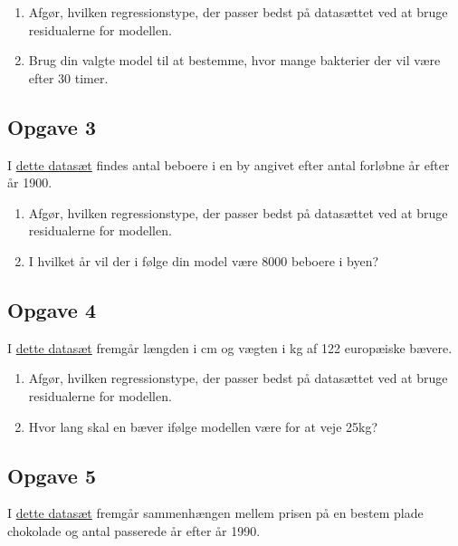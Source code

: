 \begin{enumerate}[label=\roman*)]
	\item Afgør, hvilken regressionstype, der passer bedst på datasættet ved at bruge 
	residualerne for modellen.
	\item Brug din valgte model til at bestemme, hvor mange bakterier der vil være efter 30 
	timer.
\end{enumerate}

\subsection*{Opgave 3}

I \href{https://github.com/ChristianJLex/TeachingNotes/raw/master/2023-2024/Data%20og%20lign/beboereResidual.xlsx}{\color{blue!60} dette datasæt} findes antal beboere i en by angivet efter antal forløbne år efter år 1900.

\begin{enumerate}[label=\roman*)]
	\item Afgør, hvilken regressionstype, der passer bedst på datasættet ved at bruge 
	residualerne for modellen.
	\item I hvilket år vil der i følge din model være 8000 beboere i byen?
\end{enumerate}

\subsection*{Opgave 4}

I \href{https://github.com/ChristianJLex/TeachingNotes/raw/master/2023-2024/Data og lign/Baevervaegt.xlsx}{\color{blue!60} dette datasæt} fremgår længden i cm og vægten i kg af 122 europæiske bævere. 

\begin{enumerate}[label=\roman*)]
	\item Afgør, hvilken regressionstype, der passer bedst på datasættet ved at bruge 
	residualerne for modellen.
	\item Hvor lang skal en bæver ifølge modellen være for at veje 25kg?
\end{enumerate}

\subsection*{Opgave 5}

I \href{https://github.com/ChristianJLex/TeachingNotes/raw/master/2023-2024/Data og lign/Chokoladepris.xlsx}{\color{blue!60} dette datasæt} fremgår sammenhængen mellem prisen på en bestem plade chokolade og antal passerede år efter år 1990.

